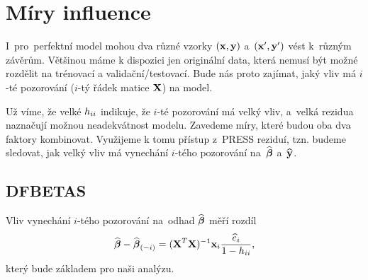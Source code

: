 \section{Míry influence}
I~pro~perfektní model mohou dva různé vzorky $(\mathbf{x},\mathbf{y})$ a~$(\mathbf{x}',\mathbf{y}')$ vést k~různým závěrům. Většinou máme k dispozici jen originální data, která nemusí být možné rozdělit na trénovací a validační/testovací. Bude nás proto zajímat, jaký vliv má $i$-té pozorování ($i$-tý řádek matice $\mathbf{X}$) na model.

Už víme, že velké $h_{ii}$ indikuje, že $i$-té pozorování má velký vliv, a~velká rezidua naznačují možnou neadekvátnost modelu. Zavedeme míry, které budou oba dva faktory kombinovat. Využijeme k tomu přístup z~PRESS reziduí, tzn. budeme sledovat, jak velký vliv má vynechání $i$-tého pozorování na~$\widehat{\boldsymbol{\beta}}$ a~$\widehat{\mathbf{y}}$.

\subsection{DFBETAS}
Vliv vynechání $i$-tého pozorování na~odhad $\widehat{\boldsymbol{\beta}}$ měří rozdíl
 $$ \widehat{\boldsymbol{\beta}}-\widehat{\boldsymbol{\beta}}_{(-i)} = {(\textbf{X}^T\textbf{X})^{-1}} \mathbf{x}_i\frac{\widehat{e}_i}{1-h_{ii}}, $$
 který bude základem pro naši analýzu.

